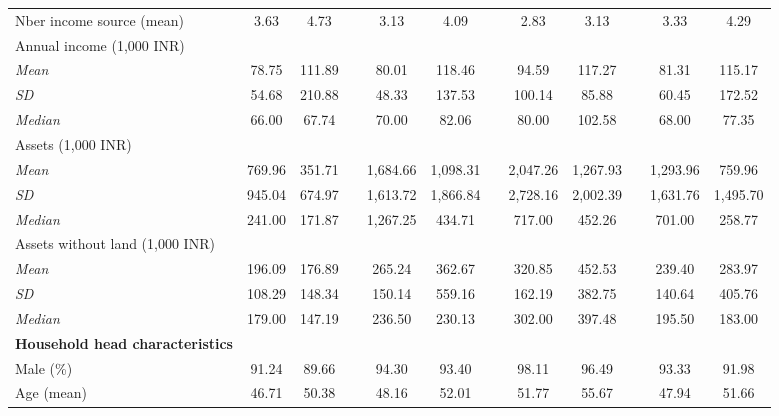 \begin{table}[htbp]
{\begin{tabular}{lccccccccccc}
    Nber income source (mean) & 3.63 & 4.73 &   & 3.13 & 4.09 &   & 2.83 & 3.13 &   & 3.33 & 4.29 \\
    Annual income (1,000 INR) &   &   &   &   &   &   &   &   &   &   &  \\
    \hspace*{0.2cm} \textit{Mean} & 78.75 & 111.89 &   & 80.01 & 118.46 &   & 94.59 & 117.27 &   & 81.31 & 115.17 \\
    \hspace*{0.2cm} \textit{SD} & 54.68 & 210.88 &   & 48.33 & 137.53 &   & 100.14 & 85.88 &   & 60.45 & 172.52 \\
    \hspace*{0.2cm} \textit{Median} & 66.00 & 67.74 &   & 70.00 & 82.06 &   & 80.00 & 102.58 &   & 68.00 & 77.35 \\
    Assets (1,000 INR) &   &   &   &   &   &   &   &   &   &   &  \\
    \hspace*{0.2cm} \textit{Mean} & 769.96 & 351.71 &   & 1,684.66 & 1,098.31 &   & 2,047.26 & 1,267.93 &   & 1,293.96 & 759.96 \\
    \hspace*{0.2cm} \textit{SD} & 945.04 & 674.97 &   & 1,613.72 & 1,866.84 &   & 2,728.16 & 2,002.39 &   & 1,631.76 & 1,495.70 \\
    \hspace*{0.2cm} \textit{Median} & 241.00 & 171.87 &   & 1,267.25 & 434.71 &   & 717.00 & 452.26 &   & 701.00 & 258.77 \\
    Assets without land (1,000 INR) &   &   &   &   &   &   &   &   &   &   &  \\
    \hspace*{0.2cm} \textit{Mean} & 196.09 & 176.89 &   & 265.24 & 362.67 &   & 320.85 & 452.53 &   & 239.40 & 283.97 \\
    \hspace*{0.2cm} \textit{SD} & 108.29 & 148.34 &   & 150.14 & 559.16 &   & 162.19 & 382.75 &   & 140.64 & 405.76 \\
    \hspace*{0.2cm} \textit{Median} & 179.00 & 147.19 &   & 236.50 & 230.13 &   & 302.00 & 397.48 &   & 195.50 & 183.00 \\
    \textbf{Household head characteristics} &   &   &   &   &   &   &   &   &   &   &  \\
    Male (\%) & 91.24 & 89.66 &   & 94.30 & 93.40 &   & 98.11 & 96.49 &   & 93.33 & 91.98 \\
    Age (mean) & 46.71 & 50.38 &   & 48.16 & 52.01 &   & 51.77 & 55.67 &   & 47.94 & 51.66 \\

\end{tabular}}
\end{table}
